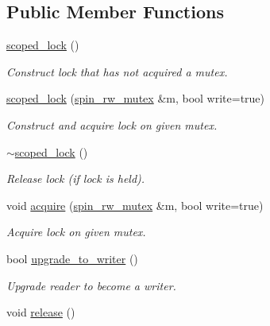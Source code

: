 \subsection*{Public Member Functions}
\begin{DoxyCompactItemize}
\item 
\hyperlink{classtbb_1_1spin__rw__mutex_1_1scoped__lock_a65696273b99d103d52067f648c7cf781}{scoped\+\_\+lock} ()
\begin{DoxyCompactList}\small\item\em Construct lock that has not acquired a mutex. \end{DoxyCompactList}\item 
\hypertarget{classtbb_1_1spin__rw__mutex_1_1scoped__lock_ad81b258e5e08ceae857a52633c43fc70}{}\hyperlink{classtbb_1_1spin__rw__mutex_1_1scoped__lock_ad81b258e5e08ceae857a52633c43fc70}{scoped\+\_\+lock} (\hyperlink{classtbb_1_1spin__rw__mutex}{spin\+\_\+rw\+\_\+mutex} \&m, bool write=true)\label{classtbb_1_1spin__rw__mutex_1_1scoped__lock_ad81b258e5e08ceae857a52633c43fc70}

\begin{DoxyCompactList}\small\item\em Construct and acquire lock on given mutex. \end{DoxyCompactList}\item 
\hypertarget{classtbb_1_1spin__rw__mutex_1_1scoped__lock_a970a354169106f8700e02c210e78f508}{}\hyperlink{classtbb_1_1spin__rw__mutex_1_1scoped__lock_a970a354169106f8700e02c210e78f508}{$\sim$scoped\+\_\+lock} ()\label{classtbb_1_1spin__rw__mutex_1_1scoped__lock_a970a354169106f8700e02c210e78f508}

\begin{DoxyCompactList}\small\item\em Release lock (if lock is held). \end{DoxyCompactList}\item 
\hypertarget{classtbb_1_1spin__rw__mutex_1_1scoped__lock_a712147de02598365defe35076ca9ec3f}{}void \hyperlink{classtbb_1_1spin__rw__mutex_1_1scoped__lock_a712147de02598365defe35076ca9ec3f}{acquire} (\hyperlink{classtbb_1_1spin__rw__mutex}{spin\+\_\+rw\+\_\+mutex} \&m, bool write=true)\label{classtbb_1_1spin__rw__mutex_1_1scoped__lock_a712147de02598365defe35076ca9ec3f}

\begin{DoxyCompactList}\small\item\em Acquire lock on given mutex. \end{DoxyCompactList}\item 
bool \hyperlink{classtbb_1_1spin__rw__mutex_1_1scoped__lock_a5bb48b38f4ef2e4eda0ee64187b9f941}{upgrade\+\_\+to\+\_\+writer} ()
\begin{DoxyCompactList}\small\item\em Upgrade reader to become a writer. \end{DoxyCompactList}\item 
\hypertarget{classtbb_1_1spin__rw__mutex_1_1scoped__lock_add1ba1f93fcb3676084dcaf6a5a367f8}{}void \hyperlink{classtbb_1_1spin__rw__mutex_1_1scoped__lock_add1ba1f93fcb3676084dcaf6a5a367f8}{release} ()\label{classtbb_1_1spin__rw__mutex_1_1scoped__lock_add1ba1f93fcb3676084dcaf6a5a367f8}


\end{DoxyCompactItemize}
